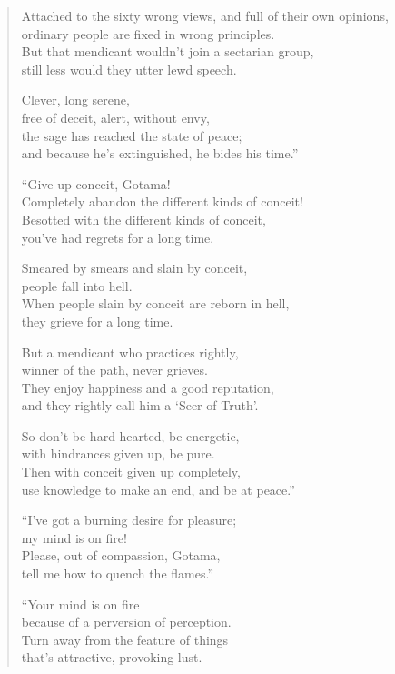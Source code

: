 \documentclass[12pt,openany]{book}%
\begin{document}
\begin{verse}
Attached to the sixty wrong views, and full of their own opinions, \\
ordinary people are fixed in wrong principles. \\
But that mendicant wouldn’t join a sectarian group, \\
still less would they utter lewd speech. 

Clever, long serene, \\
free of deceit, alert, without envy, \\
the sage has reached the state of peace; \\
and because he’s extinguished, he bides his time.” 

“Give up conceit, Gotama! \\
Completely abandon the different kinds of conceit! \\
Besotted with the different kinds of conceit, \\
you’ve had regrets for a long time. 

Smeared by smears and slain by conceit, \\
people fall into hell. \\
When people slain by conceit are reborn in hell, \\
they grieve for a long time. 

But a mendicant who practices rightly, \\
winner of the path, never grieves. \\
They enjoy happiness and a good reputation, \\
and they rightly call him a ‘Seer of Truth’. 

So don’t be hard-hearted, be energetic, \\
with hindrances given up, be pure. \\
Then with conceit given up completely, \\
use knowledge to make an end, and be at peace.” 

“I’ve got a burning desire for pleasure; \\
my mind is on fire! \\
Please, out of compassion, Gotama, \\
tell me how to quench the flames.” 

“Your mind is on fire \\
because of a perversion of perception. \\
Turn away from the feature of things \\
that’s attractive, provoking lust. 


\end{verse}
\end{document}
